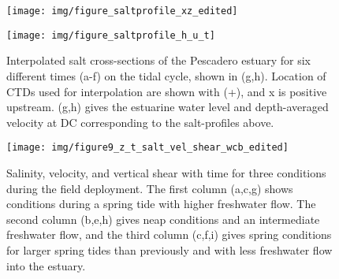\begin{figure}
\texttt{[image: img/figure\_saltprofile\_xz\_edited]}

\texttt{[image: img/figure\_saltprofile\_h\_u\_t]}

\protect\caption{Interpolated salt cross-sections of the Pescadero estuary for six
different times (a-f) on the tidal cycle, shown in (g,h). Location
of CTDs used for interpolation are shown with (+), and x is positive
upstream. (g,h) gives the estuarine water level and depth-averaged
velocity at DC corresponding to the salt-profiles above. \label{f10_Sxz}}
\end{figure}


\begin{figure}
\texttt{[image: img/figure9\_z\_t\_salt\_vel\_shear\_wcb\_edited]}

\protect\caption{Salinity, velocity, and vertical shear with time for three conditions
during the field deployment. The first column (a,c,g) shows conditions
during a spring tide with higher freshwater flow. The second column
(b,e,h) gives neap conditions and an intermediate freshwater flow,
and the third column (c,f,i) gives spring conditions for larger spring
tides than previously and with less freshwater flow into the estuary.
\label{f11_SUtz}}
\end{figure}


%



